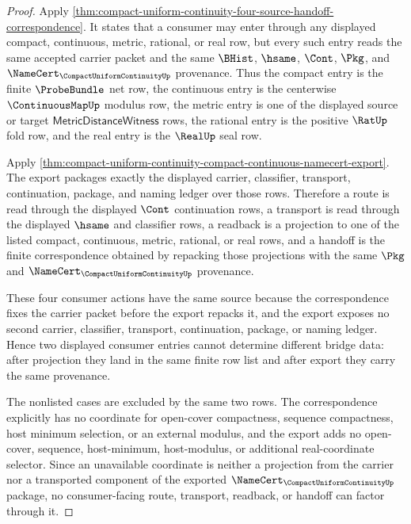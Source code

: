 \begin{proof}
Apply \autoref{thm:compact-uniform-continuity-four-source-handoff-correspondence}. It states that a consumer may enter through any displayed compact, continuous, metric, rational, or real row, but every such entry reads the same accepted carrier packet and the same $\BHist$, $\hsame$, $\Cont$, $\Pkg$, and $\NameCert_{\CompactUniformContinuityUp}$ provenance. Thus the compact entry is the finite $\ProbeBundle$ net row, the continuous entry is the centerwise $\ContinuousMapUp$ modulus row, the metric entry is one of the displayed source or target $\mathsf{MetricDistanceWitness}$ rows, the rational entry is the positive $\RatUp$ fold row, and the real entry is the $\RealUp$ seal row.

Apply \autoref{thm:compact-uniform-continuity-compact-continuous-namecert-export}. The export packages exactly the displayed carrier, classifier, transport, continuation, package, and naming ledger over those rows. Therefore a route is read through the displayed $\Cont$ continuation rows, a transport is read through the displayed $\hsame$ and classifier rows, a readback is a projection to one of the listed compact, continuous, metric, rational, or real rows, and a handoff is the finite correspondence obtained by repacking those projections with the same $\Pkg$ and $\NameCert_{\CompactUniformContinuityUp}$ provenance.

These four consumer actions have the same source because the correspondence fixes the carrier packet before the export repacks it, and the export exposes no second carrier, classifier, transport, continuation, package, or naming ledger. Hence two displayed consumer entries cannot determine different bridge data: after projection they land in the same finite row list and after export they carry the same provenance.

The nonlisted cases are excluded by the same two rows. The correspondence explicitly has no coordinate for open-cover compactness, sequence compactness, host minimum selection, or an external modulus, and the export adds no open-cover, sequence, host-minimum, host-modulus, or additional real-coordinate selector. Since an unavailable coordinate is neither a projection from the carrier nor a transported component of the exported $\NameCert_{\CompactUniformContinuityUp}$ package, no consumer-facing route, transport, readback, or handoff can factor through it.
\end{proof}

